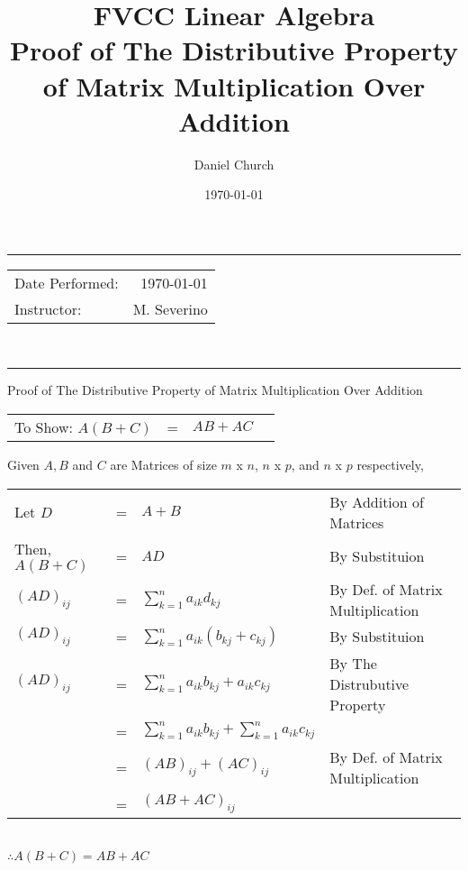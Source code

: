 \documentclass{article}
\title{FVCC Linear Algebra\\ Proof of The Distributive Property of Matrix Multiplication Over Addition \\ } 		%
\author{Daniel Church} 													%
\date{\today}
\begin{document}
\maketitle
\noindent
\rule[4mm]{17cm}{2pt}
\begin{tabular}{l r}
Date Performed: & \today \\
Instructor: & M. Severino																%
\end{tabular}\\
\rule[4mm]{17cm}{2pt}
\newpage
{\centering
\LARGE Proof of The Distributive Property of Matrix Multiplication Over Addition \par
}
\doublespacing
\begin{tabular}{@{}l l l @{\hskip 2.5in}l}
To Show: $A(B+C)$ & = & $AB + AC$ & 
\end{tabular}

Given $A, B$ and $C$ are Matrices of size $m$ x $n$, $n$ x $p$, and $n$ x $p$ respectively,

\begin{tabular}{@{}l l l @{\hskip 2in}l}
Let $D$ & = & $A+B$ & By Addition of Matrices\\
Then, $A(B+C)$ & = & $AD$ & By Substituion\\
$(AD)_{ij}$ & = & $\displaystyle\sum_{k=1}^{n} a_{ik}d_{kj}$ & By Def. of Matrix Multiplication\\%
$(AD)_{ij}$ & = & $\displaystyle\sum_{k=1}^{n} a_{ik}(b_{kj}+c_{kj})$ & By Substituion\\%
$(AD)_{ij}$ & = & $\displaystyle\sum_{k=1}^{n} a_{ik}b_{kj}+a_{ik}c_{kj}$ & By The Distrubutive Property\\%
& = & $\displaystyle\sum_{k=1}^{n} a_{ik}b_{kj} + \displaystyle\sum_{k=1}^{n} a_{ik}c_{kj}$ & \\
& = & $(AB)_{ij}+(AC)_{ij}$ & By Def. of Matrix Multiplication\\
& = & $(AB+AC)_{ij}$ & \\
\end{tabular}\\

$\therefore A(B+C) = AB + AC$
\end{document}
